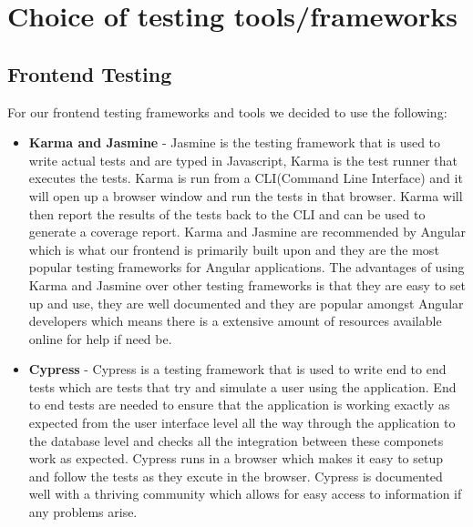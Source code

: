 \documentclass[12pt]{article}
\begin{document}
\section{Choice of testing tools/frameworks}
\subsection{Frontend Testing}
For our frontend testing frameworks and tools we decided to use the following:
\begin{itemize}
    \item \textbf{Karma and Jasmine} - Jasmine is the testing framework that is used to write actual tests and are typed in Javascript, Karma is the test runner that executes the tests. Karma is run from a CLI(Command Line Interface) and it will open up a browser window and run the tests in that browser. Karma will then report the results of the tests back to the CLI and can be used to generate a coverage report. Karma and Jasmine are recommended by Angular which is what our frontend is primarily built upon and they are the most popular testing frameworks for Angular applications. The advantages of using Karma and Jasmine over other testing frameworks is that they are easy to set up and use, they are well documented and they are popular amongst Angular developers which means there is a extensive amount of resources available online for help if need be.
    \item \textbf{Cypress} - Cypress is a testing framework that is used to write end to end tests which are tests that try and simulate a user using the application. End to end tests are needed to ensure that the application is working exactly as expected from the user interface level all the way through the application to the database level and checks all the integration between these componets work as expected. Cypress runs in a browser which makes it easy to setup and follow the tests as they excute in the browser. Cypress is documented well with a thriving community which allows for easy access to information if any problems arise.
\end{itemize}
\end{document}
